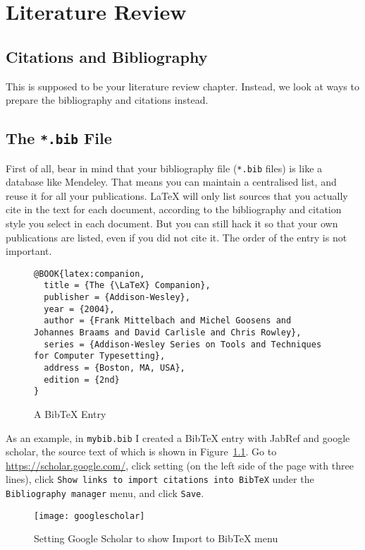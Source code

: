 \chapter{Literature Review}\label{chap:review}

\section{Citations and Bibliography}
This is supposed to be your literature review chapter. Instead, we look at ways to prepare the bibliography and citations instead. 

\section{The \texttt{*.bib} File}
First of all, bear in mind that your bibliography file (\verb|*.bib| files) is like a database like Mendeley.  That means you can maintain a centralised list, and reuse it for all your publications.  \LaTeX{} will only list sources that you actually cite in the text for each document, according to the bibliography and citation style you select in each document.  But you can still hack it so that your own publications are listed, even if you did not cite it. The order of the entry is not important. 
 

\begin{figure}[htb!]
\begin{lstlisting}[language={}]
@BOOK{latex:companion,
  title = {The {\LaTeX} Companion},
  publisher = {Addison-Wesley},
  year = {2004},
  author = {Frank Mittelbach and Michel Goosens and Johannes Braams and David Carlisle and Chris Rowley},
  series = {Addison-Wesley Series on Tools and Techniques for Computer Typesetting},
  address = {Boston, MA, USA},
  edition = {2nd}
}
\end{lstlisting}
\caption{A BibTeX Entry}\label{fig:bibtex}
\end{figure}

\clearpage	%
As an example, in \verb|mybib.bib| I created a Bib\TeX{} entry with JabRef and google scholar, the source text of which is shown in Figure~\ref{fig:bibtex}. Go to \url{https://scholar.google.com/}, click setting (on the left side of the page with three lines), click \verb|Show links to import citations into BibTeX| under the \verb|Bibliography manager| menu, and click \verb|Save|. 

\begin{figure}[htb!]\centering
	\texttt{[image: googlescholar]}
	\caption{Setting Google Scholar to show Import to BibTeX menu}\label{fig:googlescholar}
\end{figure}

